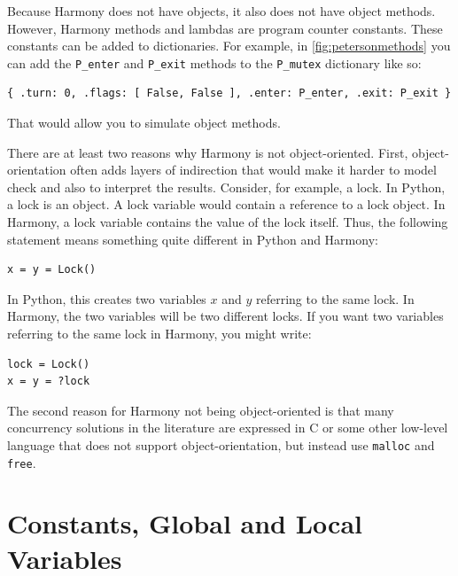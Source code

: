 \documentclass{report}
\newenvironment{code}{
\tcolorbox
}{
\endtcolorbox
}
\begin{document}
Because Harmony does not have objects, it also does not have object methods.
However, Harmony methods and lambdas are program counter constants.
These constants can be added to dictionaries.
For example, in \autoref{fig:petersonmethods}
you can add the \texttt{P\_enter} and
\texttt{P\_exit} methods to the \texttt{P\_mutex} dictionary
like so:
\begin{code}
\begin{verbatim}
{ .turn: 0, .flags: [ False, False ], .enter: P_enter, .exit: P_exit }
\end{verbatim}
\end{code}
That would allow you to simulate object methods.

There are at least two reasons why Harmony is not object-oriented.
First,
object-orientation often adds layers of indirection that would make it
harder to model check and also to interpret the results.  Consider, for example,
a lock.  In Python, a lock is an object.  A lock variable would contain a
reference to a lock object.  In Harmony, a lock variable contains the value
of the lock itself.
Thus, the following statement means something quite different in Python and
Harmony:

\begin{code}
\begin{verbatim}
x = y = Lock()
\end{verbatim}
\end{code}

In Python, this creates two variables $x$ and $y$ referring to the same lock.
In Harmony, the two variables will be two different locks.  If you want two
variables referring to the same lock in Harmony, you might write:

\begin{code}
\begin{verbatim}
lock = Lock()
x = y = ?lock
\end{verbatim}
\end{code}

The second reason for Harmony not being object-oriented is that
many concurrency solutions in the literature are
expressed in C or some other low-level language that does not support
object-orientation, but instead use \texttt{malloc} and \texttt{free}.

\section{Constants, Global and Local Variables}\label{sec:vars}
\end{document}
